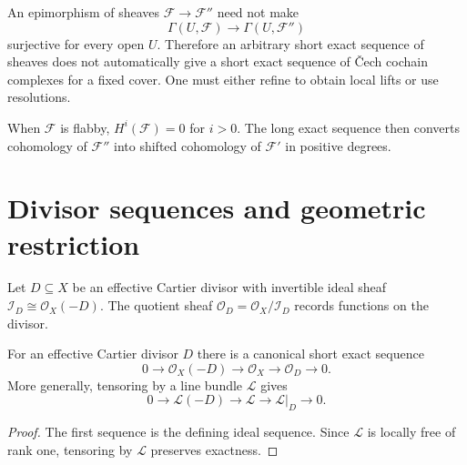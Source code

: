 \begin{warning}\label{warning:vi48-cover-caveat}
An epimorphism of sheaves $\mathcal F\to\mathcal F''$ need not make
\[
\Gamma(U,\mathcal F)\to\Gamma(U,\mathcal F'')
\]
surjective for every open $U$.  Therefore an arbitrary short exact sequence of sheaves does not automatically give a short exact sequence of \v{C}ech cochain complexes for a fixed cover.  One must either refine to obtain local lifts or use resolutions.
\end{warning}

\begin{example}\label{ex:vi48-expand-03}
When $\mathcal F$ is flabby, $H^i(\mathcal F)=0$ for $i>0$.  The long exact sequence then converts cohomology of $\mathcal F''$ into shifted cohomology of $\mathcal F'$ in positive degrees.
\end{example}
\section{Divisor sequences and geometric restriction}

\begin{definition}\label{def:vi48-effective-cartier}
Let $D\subseteq X$ be an effective Cartier divisor with invertible ideal sheaf $\mathcal I_D\cong\mathcal O_X(-D)$.  The quotient sheaf $\mathcal O_D=\mathcal O_X/\mathcal I_D$ records functions on the divisor.
\end{definition}

\begin{proposition}\label{prop:vi48-divisor-sequence}
For an effective Cartier divisor $D$ there is a canonical short exact sequence
\[
0\longrightarrow\mathcal O_X(-D)\longrightarrow\mathcal O_X\longrightarrow\mathcal O_D\longrightarrow0.
\]
More generally, tensoring by a line bundle $\mathcal L$ gives
\[
0\longrightarrow\mathcal L(-D)\longrightarrow\mathcal L\longrightarrow\mathcal L|_D\longrightarrow0.
\]
\begin{proof}
The first sequence is the defining ideal sequence.  Since $\mathcal L$ is locally free of rank one, tensoring by $\mathcal L$ preserves exactness.
\end{proof}
\end{proposition}

